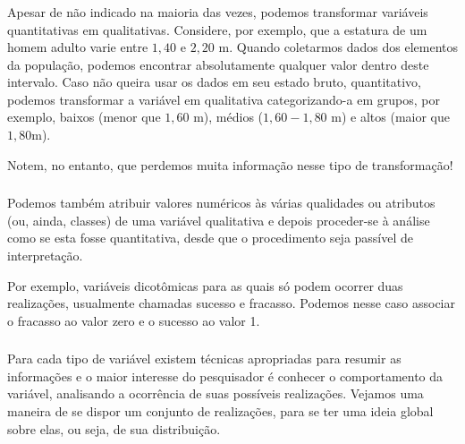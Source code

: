 \documentclass[12pt]{beamer}
\begin{document}
\begin{frame}{}
\frametitle{}
\begin{block}{}
\justifying
Apesar de não indicado na maioria das vezes, podemos transformar variáveis quantitativas em qualitativas. Considere, por exemplo, que a estatura de um homem adulto varie entre $1,40$ e $2,20$ m. Quando coletarmos dados dos elementos da população, podemos encontrar absolutamente qualquer valor dentro deste intervalo. Caso não queira usar os dados em seu estado bruto, quantitativo, podemos transformar a variável em qualitativa categorizando-a em grupos, por exemplo, baixos (menor que $1,60$ m), médios ($1,60-1,80$ m) e altos (maior que $1,80$m). 
\end{block}
\pause
\begin{block}{}
Notem, no entanto, que perdemos muita informação nesse tipo de transformação!
\end{block}
\end{frame}

\begin{frame}{}
\frametitle{}
\begin{block}{}
\justifying
Podemos também atribuir valores numéricos às várias qualidades ou atributos (ou, ainda, classes) de uma variável qualitativa e depois proceder-se à análise como se esta fosse quantitativa, desde que o procedimento seja passível de interpretação. 
\end{block}
\pause
\begin{block}{}
Por exemplo, variáveis dicotômicas para as quais só podem ocorrer duas realizações, usualmente chamadas sucesso e fracasso. Podemos nesse caso associar o fracasso ao valor zero e o sucesso ao valor 1.
\end{block}
\end{frame}

\begin{frame}{}
\frametitle{}
\begin{block}{}
\justifying
Para cada tipo de variável existem técnicas apropriadas para resumir as informações e o maior interesse do pesquisador é conhecer o comportamento da variável, analisando a ocorrência de suas possíveis realizações. Vejamos uma maneira de se dispor um conjunto de realizações, para se ter uma ideia global sobre elas, ou seja, de sua distribuição.
\end{block}
\end{frame}
\end{document}
